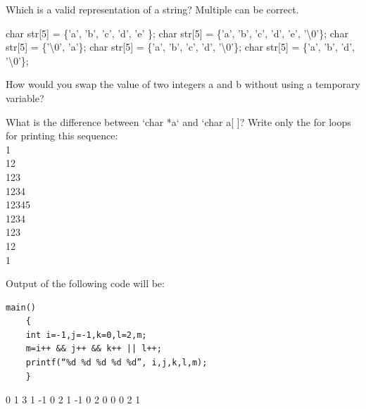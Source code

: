 \documentclass[12pt]{exam}
\begin{document}
\begin{questions}
\question[2]Which is a valid representation of a string? Multiple can be correct.
\begin{choices}	
\choice char str[5] = \{'a', 'b', 'c', 'd', 'e' \};
\choice char str[5] = \{'a', 'b', 'c', 'd', 'e', '\textbackslash 0'\};
\choice char str[5] = \{'\textbackslash0', 'a'\};
\choice char str[5] = \{'a', 'b', 'c', 'd', '\textbackslash 0'\};
\choice char str[5] = \{'a', 'b', 'd', '\textbackslash 0'\};
\end{choices}

\question[2]How would you swap the value of two integers a and b without using a temporary variable?
\makeemptybox{5em}

\question[2]What is the difference between `char *a` and `char a[ ]?
\makeemptybox{5em}
\question[2]Write only the for loops for printing this sequence:\\
1\\
12\\
123\\
1234\\
12345\\
1234\\
123\\
12\\
1 
\makeemptybox{6em}


\question[2] Output of the following code will be:
\begin{lstlisting}
main()
	{
	int i=-1,j=-1,k=0,l=2,m;
	m=i++ && j++ && k++ || l++;
	printf(“%d %d %d %d %d”, i,j,k,l,m);
	}
\end{lstlisting}
\begin{multicols}{2}
\begin{choices}	
 0 1 3 1
 -1 0 2 1	
 -1 0 2 0
 0 0 2 1
\end{choices}
\end{multicols}




\end{questions}
\end{document}
